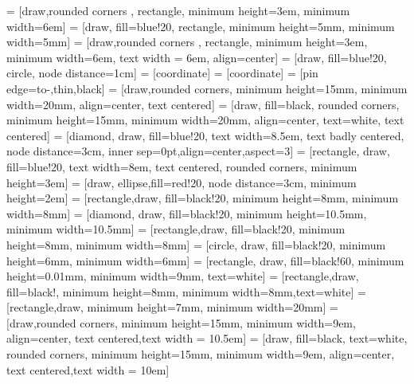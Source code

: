 \usepackage{schemabloc}
\usetikzlibrary{shapes,arrows}
\usepackage{pgfplots}
\usetikzlibrary{plotmarks}
\pgfplotsset{compat=newest}
\pgfplotsset{filter discard warning=false}

\usetikzlibrary{external}
\tikzexternalize[prefix=tikz/]


 = [draw,rounded corners , rectangle, minimum height=3em, minimum width=6em]
 = [draw, fill=blue!20, rectangle, minimum height=5mm, minimum width=5mm]
 = [draw,rounded corners , rectangle, minimum height=3em, minimum width=6em, text width = 6em, align=center]     
 = [draw, fill=blue!20, circle, node distance=1cm]
 = [coordinate]
 = [coordinate]
 = [pin edge={to-,thin,black}]
 = [draw,rounded corners, minimum height=15mm, minimum width=20mm, align=center, text centered]
 = [draw, fill=black, rounded corners, minimum height=15mm, minimum width=20mm, align=center, text=white, text centered]
 = [diamond, draw, fill=blue!20, text width=8.5em, text badly centered, node distance=3cm, inner sep=0pt,align=center,aspect=3]
 = [rectangle, draw, fill=blue!20, text width=8em, text centered, rounded corners, minimum height=3em]
 = [draw, ellipse,fill=red!20, node distance=3cm, minimum height=2em]
 = [rectangle,draw, fill=black!20, minimum height=8mm, minimum width=8mm]
 = [diamond, draw, fill=black!20, minimum height=10.5mm, minimum width=10.5mm]
 = [rectangle,draw, fill=black!20, minimum height=8mm, minimum width=8mm]
 = [circle, draw, fill=black!20, minimum height=6mm, minimum width=6mm]
 = [rectangle, draw, fill=black!60, minimum height=0.01mm, minimum width=9mm, text=white]
 = [rectangle,draw, fill=black!, minimum height=8mm, minimum width=8mm,text=white]
 = [rectangle,draw, minimum height=7mm, minimum width=20mm]
 = [draw,rounded corners, minimum height=15mm, minimum width=9em, align=center, text centered,text width = 10.5em]
 = [draw, fill=black, text=white, rounded corners, minimum height=15mm, minimum width=9em, align=center, text centered,text width = 10em]